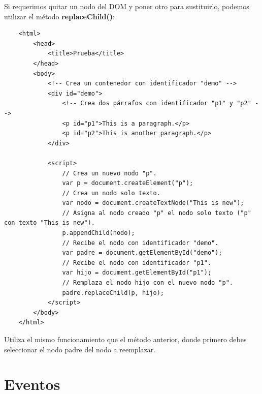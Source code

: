 Si requerimos quitar un nodo del DOM y poner otro para sustituirlo, podemos utilizar el método \textbf{replaceChild()}:
\begin{lstlisting}
    <html>
        <head>
            <title>Prueba</title>
        </head>
        <body>
            <!-- Crea un contenedor con identificador "demo" -->
            <div id="demo">
                <!-- Crea dos párrafos con identificador "p1" y "p2" -->
                <p id="p1">This is a paragraph.</p>
                <p id="p2">This is another paragraph.</p>
            </div>
            
            <script>
                // Crea un nuevo nodo "p".
                var p = document.createElement("p");
                // Crea un nodo solo texto.
                var nodo = document.createTextNode("This is new");
                // Asigna al nodo creado "p" el nodo solo texto ("p" con texto "This is new").
                p.appendChild(nodo);
                // Recibe el nodo con identificador "demo".
                var padre = document.getElementById("demo");
                // Recibe el nodo con identificador "p1".
                var hijo = document.getElementById("p1");
                // Remplaza el nodo hijo con el nuevo nodo "p".
                padre.replaceChild(p, hijo);
            </script>
        </body>
    </html>
\end{lstlisting}

Utiliza el mismo funcionamiento que el método anterior, donde primero debes seleccionar el nodo padre del nodo a reemplazar.



\section{Eventos}

